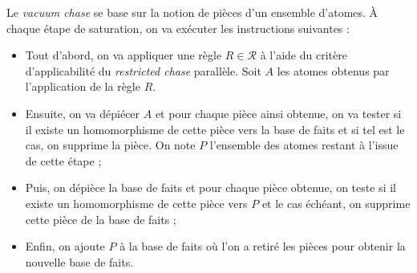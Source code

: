 Le \textit{vacuum chase} se base sur la notion de pièces d'un ensemble d'atomes. À chaque étape de saturation, on va exécuter les instructions suivantes :
\begin{itemize}
    \item Tout d'abord, on va appliquer une règle $R \in \mathcal{R}$ à l'aide du critère d'applicabilité du \textit{restricted chase} parallèle. Soit $A$ les atomes obtenus par l'application de la règle $R$.
    \item Ensuite, on va dépiécer $A$ et pour chaque pièce ainsi obtenue, on va tester si il existe un homomorphisme de cette pièce vers la base de faits et si tel est le cas, on supprime la pièce. On note $P$ l'ensemble des atomes restant à l'issue de cette étape ;
    \item Puis, on dépièce la base de faits et pour chaque pièce obtenue, on teste si il existe un homomorphisme de cette pièce vers $P$ et le cas échéant, on supprime cette pièce de la base de faits ; 
    \item Enfin, on ajoute $P$ à la base de faits où l'on a retiré les pièces pour obtenir la nouvelle base de faits.
\end{itemize}

